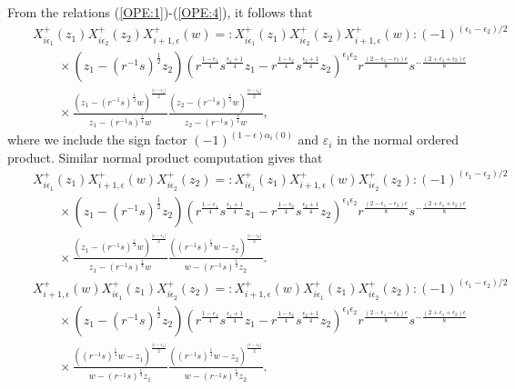 \documentclass{amsproc}
\theoremstyle{remark}
\numberwithin{equation}{section}
\begin{document}
From the relations (\ref{OPE:1})-(\ref{OPE:4}), it follows that
\begin{eqnarray*}
&&X_{i{\epsilon}_1}^+(z_1)X_{i{\epsilon}_2}^+(z_2)X^+_{i+1,{\epsilon}}(w)=
:X_{i{\epsilon}_1}^+(z_1)X_{i{\epsilon}_2}^+(z_2)X^+_{i+1,{\epsilon}}(w):(-1)^{({\epsilon}_1-{\epsilon}_2)/2}\\
&&\qquad \times (z_1-(r^{-1}s)^{\frac{1}{2}}z_2)
(r^{\frac{1-{\epsilon}_1}{4}}s^{\frac{{\epsilon}_1+1}{4}}z_1-
r^{\frac{1-{\epsilon}_2}{4}}s^{\frac{{\epsilon}_2+1}{4}}z_2)^{{\epsilon}_1{\epsilon}_2}
r^{\frac{(2-{\epsilon}_1-{\epsilon}_2){\epsilon}}{8}}s^{-\frac{(2+{\epsilon}_1+{\epsilon}_2){\epsilon}}{8}}  \\
&&\qquad \times
\frac{(z_1-(r^{-1}s)^{\frac{\epsilon}{4}}w)^{\frac{|{\epsilon}-{\epsilon}_1|}2}}{z_1-(r^{-1}s)^{\frac{1}{4}}w}
\frac{(z_2-(r^{-1}s)^{\frac{\epsilon}{4}}w)^{\frac{|{\epsilon}-{\epsilon}_2|}2}}{z_2-(r^{-1}s)^{\frac{1}{4}}w},
\end{eqnarray*}
where we include the sign factor $(-1)^{(1-{\epsilon}){\alpha}_i(0)}$ and
${\varepsilon}_i$ in the normal ordered product. Similar normal product
computation gives that
\begin{eqnarray*}
&&X_{i{\epsilon}_1}^+(z_1)X^+_{i+1,{\epsilon}}(w)X_{i{\epsilon}_2}^+(z_2)=
:X_{i{\epsilon}_1}^+(z_1)X^+_{i+1,{\epsilon}}(w)X_{i{\epsilon}_2}^+(z_2):(-1)^{({\epsilon}_1-{\epsilon}_2)/2}\\
&&\qquad \times (z_1-(r^{-1}s)^{\frac{1}{2}}z_2)
(r^{\frac{1-{\epsilon}_1}{4}}s^{\frac{{\epsilon}_1+1}{4}}z_1-
r^{\frac{1-{\epsilon}_2}{4}}s^{\frac{{\epsilon}_2+1}{4}}z_2)^{{\epsilon}_1{\epsilon}_2}
r^{\frac{(2-{\epsilon}_1-{\epsilon}_2){\epsilon}}{8}}s^{-\frac{(2+{\epsilon}_1+{\epsilon}_2){\epsilon}}{8}}\\
&&\qquad \times
\frac{(z_1-(r^{-1}s)^{\frac{\epsilon}{4}}w)^{\frac{|{\epsilon}-{\epsilon}_1|}2}}{z_1-(r^{-1}s)^{\frac{1}{4}}w}
\frac{((r^{-1}s)^{\frac{\epsilon}{4}}w-z_2)^{\frac{|{\epsilon}-{\epsilon}_2|}2}}{w-(r^{-1}s)^{\frac{1}{4}}z_2}.
\end{eqnarray*}
\begin{eqnarray*}
&&X^+_{i+1,{\epsilon}}(w)X_{i{\epsilon}_1}^+(z_1)X_{i{\epsilon}_2}^+(z_2)=
:X^+_{i+1,{\epsilon}}(w)X_{i{\epsilon}_1}^+(z_1)X_{i{\epsilon}_2}^+(z_2):(-1)^{({\epsilon}_1-{\epsilon}_2)/2}\\
&&\qquad \times (z_1-(r^{-1}s)^{\frac{1}{2}}z_2)
(r^{\frac{1-{\epsilon}_1}{4}}s^{\frac{{\epsilon}_1+1}{4}}z_1-
r^{\frac{1-{\epsilon}_2}{4}}s^{\frac{{\epsilon}_2+1}{4}}z_2)^{{\epsilon}_1{\epsilon}_2}
r^{\frac{(2-{\epsilon}_1-{\epsilon}_2){\epsilon}}{8}}s^{-\frac{(2+{\epsilon}_1+{\epsilon}_2){\epsilon}}{8}} \\
&&\qquad \times
\frac{((r^{-1}s)^{\frac{\epsilon}{4}}w-z_1)^{\frac{|{\epsilon}-{\epsilon}_1|}2}}{w-(r^{-1}s)^{\frac{1}{4}}z_1}
\frac{((r^{-1}s)^{\frac{\epsilon}{4}}w-z_2)^{\frac{|{\epsilon}-{\epsilon}_2|}2}}{w-(r^{-1}s)^{\frac{1}{4}}z_2}.
\end{eqnarray*}
\end{document}

